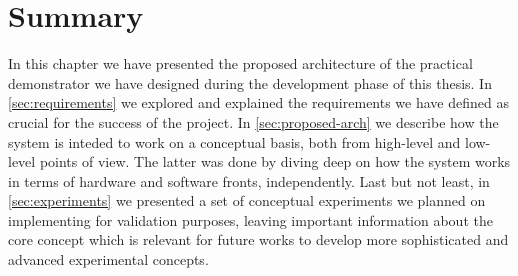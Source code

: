 \section{Summary} \label{sec:sys-arch-summary}

In this chapter we have presented the proposed architecture of the practical demonstrator we have designed during the development phase of this thesis.
In \autoref{sec:requirements} we explored and explained the requirements we have defined as crucial for the success of the project.
In \autoref{sec:proposed-arch} we describe how the system is inteded to work on a conceptual basis, both from high-level and low-level points of view.
The latter was done by diving deep on how the system works in terms of hardware and software fronts, independently.
Last but not least, in \autoref{sec:experiments} we presented a set of conceptual experiments we planned on implementing for validation purposes, leaving important information about the core concept which is relevant for future works to develop more sophisticated and advanced experimental concepts.
